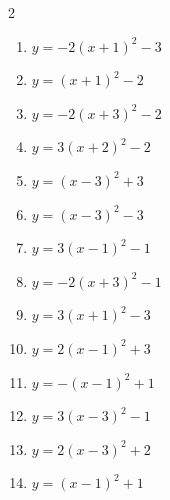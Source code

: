 \documentclass[b5paper,10pt]{ltjsarticle}
\begin{document}
\begin{multicols}{ 2 }
\begin{enumerate}
\vspace{170pt}\item $\displaystyle{} y= -2\left( x+1\right)^{2}-3$

\vspace{170pt}\item $\displaystyle{} y= \left( x+1\right)^{2}-2$

\vspace{170pt}\item $\displaystyle{} y= -2\left( x+3\right)^{2}-2$

\vspace{170pt}\item $\displaystyle{} y= 3\left( x+2\right)^{2}-2$

\vspace{170pt}\item $\displaystyle{} y= \left( x-3\right)^{2}+3$

\vspace{170pt}\item $\displaystyle{} y= \left( x-3\right)^{2}-3$

\vspace{170pt}\item $\displaystyle{} y= 3\left( x-1\right)^{2}-1$

\vspace{170pt}\item $\displaystyle{} y= -2\left( x+3\right)^{2}-1$

\vspace{170pt}\item $\displaystyle{} y= 3\left( x+1\right)^{2}-3$

\vspace{170pt}\item $\displaystyle{} y= 2\left( x-1\right)^{2}+3$

\vspace{170pt}\item $\displaystyle{} y= -\left( x-1\right)^{2}+1$

\vspace{170pt}\item $\displaystyle{} y= 3\left( x-3\right)^{2}-1$

\vspace{170pt}\item $\displaystyle{} y= 2\left( x-3\right)^{2}+2$

\vspace{170pt}\item $\displaystyle{} y= \left( x-1\right)^{2}+1$


\end{enumerate}
\end{multicols}
\end{document}
